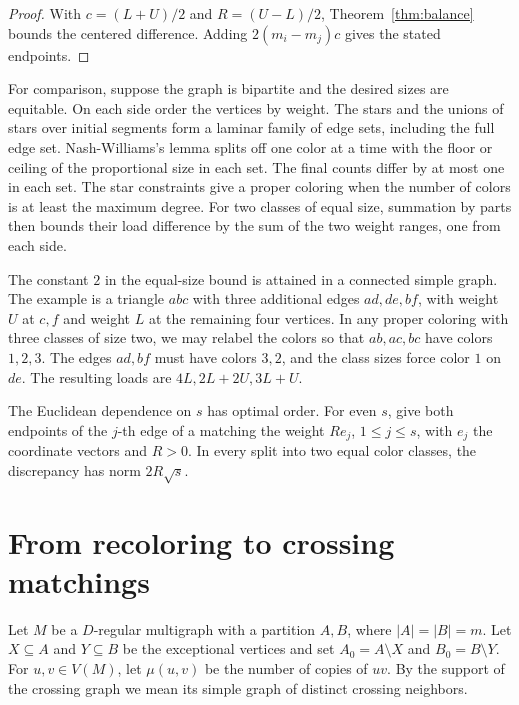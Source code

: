 \documentclass[11pt]{article}
\begin{document}
\begin{proof}
With \(c=(L+U)/2\) and \(R=(U-L)/2\), Theorem~\ref{thm:balance} bounds the centered difference. Adding \(2(m_i-m_j)c\) gives the stated endpoints.
\end{proof}

For comparison, suppose the graph is bipartite and the desired sizes are equitable. On each side order the vertices by weight. The stars and the unions of stars over initial segments form a laminar family of edge sets, including the full edge set. Nash-Williams's lemma \cite{NashWilliams} splits off one color at a time with the floor or ceiling of the proportional size in each set. The final counts differ by at most one in each set. The star constraints give a proper coloring when the number of colors is at least the maximum degree. For two classes of equal size, summation by parts then bounds their load difference by the sum of the two weight ranges, one from each side.

The constant \(2\) in the equal-size bound is attained in a connected simple graph. The example is a triangle \(abc\) with three additional edges \(ad,de,bf\), with weight \(U\) at \(c,f\) and weight \(L\) at the remaining four vertices. In any proper coloring with three classes of size two, we may relabel the colors so that \(ab,ac,bc\) have colors \(1,2,3\). The edges \(ad,bf\) must have colors \(3,2\), and the class sizes force color \(1\) on \(de\). The resulting loads are \(4L,2L+2U,3L+U\).

The Euclidean dependence on \(s\) has optimal order. For even \(s\), give both endpoints of the \(j\)-th edge of a matching the weight \(Re_j\), \(1\le j\le s\), with \(e_j\) the coordinate vectors and \(R>0\). In every split into two equal color classes, the discrepancy has norm \(2R\sqrt{s}\).

\section{From recoloring to crossing matchings}\label{sec:cross}

Let \(M\) be a \(D\)-regular multigraph with a partition \(A,B\), where \(|A|=|B|=m\). Let \(X\subseteq A\) and \(Y\subseteq B\) be the exceptional vertices and set \(A_0=A\setminus X\) and \(B_0=B\setminus Y\). For \(u,v\in V(M)\), let \(\mu(u,v)\) be the number of copies of \(uv\). By the support of the crossing graph we mean its simple graph of distinct crossing neighbors.
\end{document}
